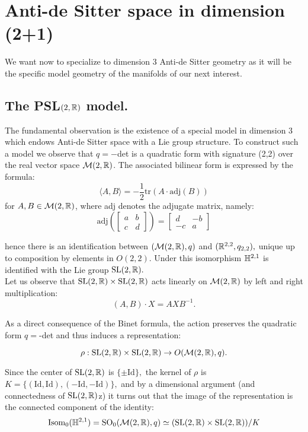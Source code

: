 \chapter{Anti-de Sitter space in dimension (2+1)}
We want now to specialize to dimension 3 Anti-de Sitter geometry as it will be the specific model geometry of the manifolds of our next interest. 
\section{The {PSL}$(2,\mathbb{R})$ model.} 

The fundamental observation is the existence of a special model in dimension 3 which endows Anti-de Sitter space with a Lie group structure. To construct such a model we observe that $q=-$det is a quadratic form with signature (2,2) over the real vector space $\mathcal{M}(2,\mathbb{R})$. The associated bilinear form is expressed by the formula:
\begin{equation}\label{quadratic}
    \langle A,B\rangle=-\frac{1}{2}\text{tr}(A\cdot\text{adj}(B))
\end{equation}
for $A,B\in\mathcal{M}(2,\mathbb{R})$, where adj denotes the adjugate matrix, namely: 
\[
    \text{adj}(\begin{bmatrix}
        a & b \\
        c & d
    \end{bmatrix}) = \begin{bmatrix}
        d & -b \\
        -c & a
    \end{bmatrix}
\]

hence there is an identification between $(\mathcal{M}(2,\mathbb{R}),q)$ and $(\mathbb{R}^{2,2}, q_{2,2}),$ unique up to composition by elements in $O(2,2)$. Under this isomorphism $\mathbb{H}^{2,1}$ is identified with the Lie group $\text{SL}(2,\mathbb{R}).$\\
Let us observe that $\text{SL}(2,\mathbb{R})\times \text{SL}(2,\mathbb{R})$ acts linearly on $\mathcal{M}(2,\mathbb{R})$ by left and right multiplication:
$$(A,B)\cdot X=AXB^{-1}.$$

As a direct consequence of the Binet formula, the action preserves the quadratic form $q=$-det and thus induces a representation: 

\[ \rho:\text{SL}(2,\mathbb{R})\times \text{SL}(2,\mathbb{R})\to O(\mathcal{M}(2,\mathbb{R}),q). \]

Since the center of $\text{SL}(2,\mathbb{R})$ is $\{\pm \text{Id}\},$ the kernel of $\rho$ is $K=\{(\text{Id},\text{Id}),(-\text{Id},-\text{Id})\},$ and by a dimensional argument (and connectedness of $\text{SL}(2,\mathbb{R})$z) it turns out that the image of the representation is the connected component of the identity: 
\[
    \text{Isom}_0(\mathbb{H}^{2,1})=\text{SO}_0(\mathcal{M}(2,\mathbb{R}),q)\simeq (\text{SL}(2,\mathbb{R})\times \text{SL}(2,\mathbb{R}))/K
\]
    
